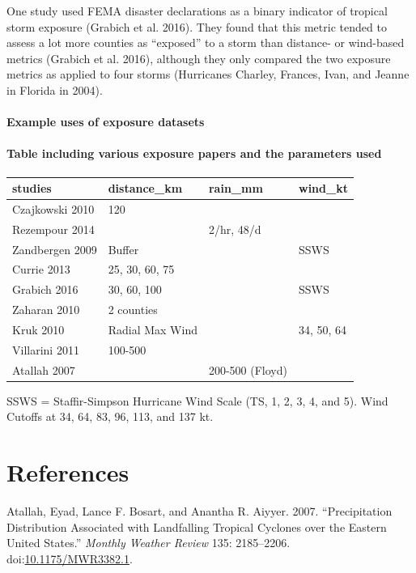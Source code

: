 \documentclass[]{elsarticle} %
\begin{document}
One study used FEMA disaster declarations as a binary indicator of
tropical storm exposure (Grabich et al. 2016). They found that this
metric tended to assess a lot more counties as ``exposed'' to a storm
than distance- or wind-based metrics (Grabich et al. 2016), although
they only compared the two exposure metrics as applied to four storms
(Hurricanes Charley, Frances, Ivan, and Jeanne in Florida in 2004).

\paragraph{Example uses of exposure
datasets}\label{example-uses-of-exposure-datasets}

\paragraph{Table including various exposure papers and the parameters
used}\label{table-including-various-exposure-papers-and-the-parameters-used}

\begin{longtable}[]{@{}llll@{}}
\toprule
studies & distance\_km & rain\_mm & wind\_kt\tabularnewline
\midrule
\endhead
Czajkowski 2010 & 120 & &\tabularnewline
Rezempour 2014 & & 2/hr, 48/d &\tabularnewline
Zandbergen 2009 & Buffer & & SSWS\tabularnewline
Currie 2013 & 25, 30, 60, 75 & &\tabularnewline
Grabich 2016 & 30, 60, 100 & & SSWS\tabularnewline
Zaharan 2010 & 2 counties & &\tabularnewline
Kruk 2010 & Radial Max Wind & & 34, 50, 64\tabularnewline
Villarini 2011 & 100-500 & &\tabularnewline
Atallah 2007 & & 200-500 (Floyd) &\tabularnewline
\bottomrule
\end{longtable}

SSWS = Staffir-Simpson Hurricane Wind Scale (TS, 1, 2, 3, 4, and 5).
Wind Cutoffs at 34, 64, 83, 96, 113, and 137 kt.

\section*{References}\label{references}

\hypertarget{refs}{}
\hypertarget{ref-Atallah2007}{}
Atallah, Eyad, Lance F. Bosart, and Anantha R. Aiyyer. 2007.
``Precipitation Distribution Associated with Landfalling Tropical
Cyclones over the Eastern United States.'' \emph{Monthly Weather Review}
135: 2185--2206.
doi:\href{https://doi.org/10.1175/MWR3382.1}{10.1175/MWR3382.1}.
\end{document}
